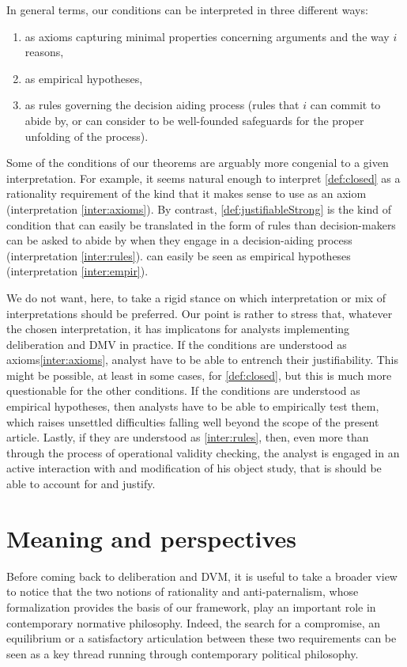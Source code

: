 \documentclass[version=last, pagesize, twoside=off, bibliography=totoc, DIV=calc, fontsize=14pt, a4paper, french, english]{scrartcl}
\begin{document}
In general terms, our conditions can be interpreted in three different ways:
\begin{enumerate}[label=({\roman*})]%
	\item \label{inter:axioms} as axioms capturing minimal properties concerning arguments and the way $i$ reasons,
	\item \label{inter:empir} as empirical hypotheses,
	\item \label{inter:rules} as rules governing the decision aiding process (rules that $i$ can commit to abide by, or can consider to be well-founded safeguards for the proper unfolding of the process).
\end{enumerate}

Some of the conditions of our theorems are arguably more congenial to a given interpretation. For example, it seems natural enough to interpret \cref{def:closed} as a rationality requirement of the kind that it makes sense to use as an axiom (interpretation \ref{inter:axioms}). By contrast, \cref{def:justifiableStrong} is the kind of condition that can easily be translated in the form of rules than decision-makers can be asked to abide by when they engage in a decision-aiding process (interpretation \ref{inter:rules}).  can easily be seen as empirical hypotheses (interpretation \ref{inter:empir}).

We do not want, here, to take a rigid stance on which interpretation or mix of interpretations should be preferred. Our point is rather to stress that, whatever the chosen interpretation, it has implicatons for analysts implementing deliberation and DMV in practice. If the conditions are understood as axioms\ref{inter:axioms}, analyst have to be able to entrench their justifiability. This might be possible, at least in some cases, for \cref{def:closed}, but this is much more questionable for the other conditions. If the conditions are understood as empirical hypotheses, then analysts have to be able to empirically test them, which raises unsettled difficulties falling well beyond the scope of the present article. Lastly, if they are understood as \ref{inter:rules}, then, even more than through the process of operational validity checking, the analyst is engaged in an active interaction with and modification of his object study, that is should be able to account for and justify.

\section{Meaning and perspectives}
\label{disc}
Before coming back to deliberation and DVM, it is useful to take a broader view to notice that the two notions of rationality and anti-paternalism, whose formalization provides the basis of our framework, play an important role in contemporary normative philosophy. Indeed, the search for a compromise, an equilibrium or a satisfactory articulation between these two requirements can be seen as a key thread running through contemporary political philosophy.
\end{document}
